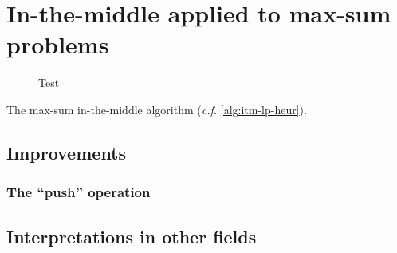 \section{In-the-middle applied to max-sum problems}

\begin{figure}
	\subfloat[Test]{}
	\caption{Test}
\end{figure}

\begin{algorithm}[tbp]

	\caption{The max-sum in-the-middle algorithm (\emph{c.f.} \cref{alg:itm-lp-heur}).}
	\label{alg:itm-max-sum}
\end{algorithm}

\subsection{Improvements}

\subsubsection{The \enquote{push} operation}

\subsection{Interpretations in other fields}
